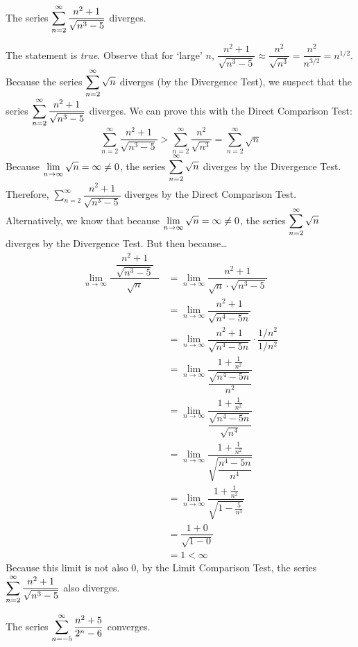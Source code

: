 \documentclass[11pt,letterpaper]{article}
\begin{document}
\newpage



 The series $\displaystyle\sum_{n=2}^\infty \dfrac{n^2 + 1}{\sqrt{n^3 - 5}}$ diverges. \pspace

\sol The statement is \textit{true}. Observe that for `large' $n$, $\dfrac{n^2 + 1}{\sqrt{n^3 - 5}} \approx \dfrac{n^2}{\sqrt{n^3}}= \dfrac{n^2}{n^{3/2}}= n^{1/2}$. Because the series $\displaystyle\sum_{n=2}^\infty \sqrt{n}$ diverges (by the Divergence Test), we suspect that the series $\displaystyle\sum_{n=2}^\infty \dfrac{n^2 + 1}{\sqrt{n^3 - 5}}$ diverges. We can prove this with the Direct Comparison Test:
	\[
	\sum_{n=2}^\infty \dfrac{n^2 + 1}{\sqrt{n^3 - 5}} > \sum_{n=2}^\infty \dfrac{n^2}{\sqrt{n^3}}= \sum_{n=2}^\infty \sqrt{n}
	\]
Because $\displaystyle\lim_{n \to \infty} \sqrt{n}= \infty \neq 0$, the series $\displaystyle\sum_{n=2}^\infty \sqrt{n}$ diverges by the Divergence Test. Therefore, $\sum_{n=2}^\infty \dfrac{n^2 + 1}{\sqrt{n^3 - 5}}$ diverges by the Direct Comparison Test. Alternatively, we know that because $\displaystyle\lim_{n \to \infty} \sqrt{n}= \infty \neq 0$, the series $\displaystyle\sum_{n=2}^\infty \sqrt{n}$ diverges by the Divergence Test. But then because\dots
	\[
	\begin{aligned}
	\lim_{n \to \infty} \dfrac{\;\;\dfrac{n^2 + 1}{\sqrt{n^3 - 5}}\;\;}{\sqrt{n}}&= \lim_{n \to \infty} \dfrac{n^2 + 1}{\sqrt{n} \cdot \sqrt{n^3 - 5}} \\
	&= \lim_{n \to \infty} \dfrac{n^2 + 1}{\sqrt{n^4 - 5n}} \\
	&= \lim_{n \to \infty} \dfrac{n^2 + 1}{\sqrt{n^4 - 5n}} \cdot \dfrac{1/n^2}{1/n^2} \\
	&= \lim_{n \to \infty} \dfrac{\;\;1 + \frac{1}{n^2}\;\;}{\dfrac{\sqrt{n^4 - 5n}}{n^2}} \\
	&= \lim_{n \to \infty} \dfrac{\;\;1 + \frac{1}{n^2}\;\;}{\dfrac{\sqrt{n^4 - 5n}}{\sqrt{n^4}}} \\
	&= \lim_{n \to \infty} \dfrac{\;\;1 + \frac{1}{n^2}\;\;}{\sqrt{\dfrac{n^4 - 5n}{n^4}}} \\
	&= \lim_{n \to \infty} \dfrac{\;\;1 + \frac{1}{n^2}\;\;}{\sqrt{1 - \frac{5}{n^3}}} \\
	&= \dfrac{1 + 0}{\sqrt{1 - 0}} \\
	&= 1 < \infty
	\end{aligned}
	\]
Because this limit is not also $0$, by the Limit Comparison Test, the series $\displaystyle\sum_{n=2}^\infty \dfrac{n^2 + 1}{\sqrt{n^3 - 5}}$ also diverges. \pvspace{1.3cm}



 The series $\displaystyle\sum_{n= -5}^\infty \dfrac{n^2 + 5}{2^n - 6}$ converges. \pspace
\end{document}
